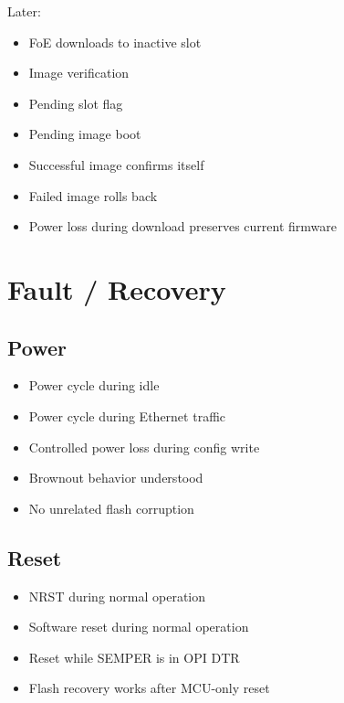 \documentclass[10pt,a4paper,oneside]{report}
\providecommand{\tightlist}{\setlength{\itemsep}{1pt}\setlength{\parskip}{1pt}}
\begin{document}
Later:

\begin{itemize}
\tightlist
\item[$\square$]
  FoE downloads to inactive slot
\item[$\square$]
  Image verification
\item[$\square$]
  Pending slot flag
\item[$\square$]
  Pending image boot
\item[$\square$]
  Successful image confirms itself
\item[$\square$]
  Failed image rolls back
\item[$\square$]
  Power loss during download preserves current firmware
\end{itemize}

\section{Fault / Recovery}\label{wiki-hardware-bring-up-and-testing--20-fault--recovery}

\subsection{Power}\label{wiki-hardware-bring-up-and-testing--power}

\begin{itemize}
\tightlist
\item[$\square$]
  Power cycle during idle
\item[$\square$]
  Power cycle during Ethernet traffic
\item[$\square$]
  Controlled power loss during config write
\item[$\square$]
  Brownout behavior understood
\item[$\square$]
  No unrelated flash corruption
\end{itemize}

\subsection{Reset}\label{wiki-hardware-bring-up-and-testing--reset}

\begin{itemize}
\tightlist
\item[$\square$]
  NRST during normal operation
\item[$\square$]
  Software reset during normal operation
\item[$\square$]
  Reset while SEMPER is in OPI DTR
\item[$\square$]
  Flash recovery works after MCU-only reset
\end{itemize}
\end{document}
